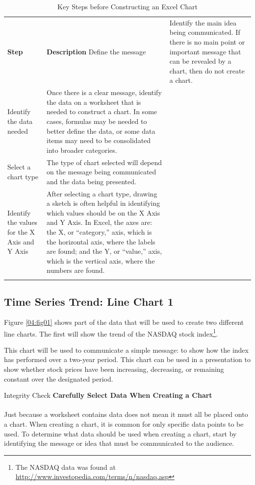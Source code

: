 \begin{table}[H]
	{\small
		\begin{longtable}{L{0.75in}L{3.50in}} %
			\textbf{Step} & \textbf{Description} \endhead
			\hline
			Define the message & Identify the main idea being communicated. If there is no main point or important message that can be revealed by a chart, then do not create a chart.\\
			Identify the data needed & Once there is a clear message, identify the data on a worksheet that is needed to construct a chart. In some cases, formulas may be needed to better define the data, or some data items may need to be consolidated into broader categories.\\
			Select a chart type & The type of chart selected will depend on the message being communicated and the data being presented.\\
			Identify the values for the X Axis and Y Axis & After selecting a chart type, drawing a sketch is often helpful in identifying which values should be on the X Axis and Y Axis. In Excel, the axes are: the X, or ``category,'' axis, which is the horizontal axis, where the labels are found; and the Y, or ``value,'' axis, which is the vertical axis, where the numbers are found.\\
			\caption{Key Steps before Constructing an Excel Chart}
			\label{04:tab01}
		\end{longtable}
	} %
\end{table}

\subsection{Time Series Trend: Line Chart 1}

Figure \ref{04:fig01} shows part of the data that will be used to create two different line charts. The first will show the trend of the NASDAQ stock index\footnote{The NASDAQ data was found at \url{http://www.investopedia.com/terms/n/nasdaq.asp}}.

This chart will be used to communicate a simple message: to show how the index has performed over a two-year period. This chart can be used in a presentation to show whether stock prices have been increasing, decreasing, or remaining constant over the designated period.

\begin{center}
	\begin{infobox}{Integrity Check}
		\textbf{Carefully Select Data When Creating a Chart}
		\\
		\\
		Just because a worksheet contains data does not mean it must all be placed onto a chart. When creating a chart, it is common for only specific data points to be used. To determine what data should be used when creating a chart, start by identifying the message or idea that must be communicated to the audience.
	\end{infobox}
\end{center}

